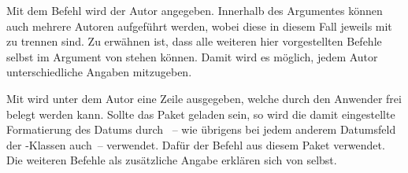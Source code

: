 \begin{Declaration}{}
\begin{Declaration}{}
\begin{Declaration}{}
\begin{Declaration}{}
\begin{Declaration}{}
\begin{Declaration}{}
\printdeclarationlist%
%
%
%
Mit dem Befehl  wird der Autor angegeben. Innerhalb des 
Argumentes können auch mehrere Autoren aufgeführt werden, wobei diese in diesem 
Fall jeweils mit  zu trennen sind. Zu erwähnen ist, dass alle 
weiteren hier vorgestellten Befehle selbst im Argument von  
stehen können. Damit wird es möglich, jedem Autor unterschiedliche Angaben 
mitzugeben.

Mit  wird unter dem Autor eine Zeile ausgegeben, welche 
durch den Anwender frei belegt werden kann. Sollte das Paket  
geladen sein, so wird die damit eingestellte Formatierung des Datums durch 
~-- wie übrigens bei jedem anderem Datumsfeld der 
\TUDScript-Klassen auch~-- verwendet. Dafür der Befehl  aus 
diesem Paket verwendet. Die weiteren Befehle als zusätzliche Angabe erklären 
sich von selbst.
\end{Declaration}
\end{Declaration}
\end{Declaration}
\end{Declaration}
\end{Declaration}
\end{Declaration}

